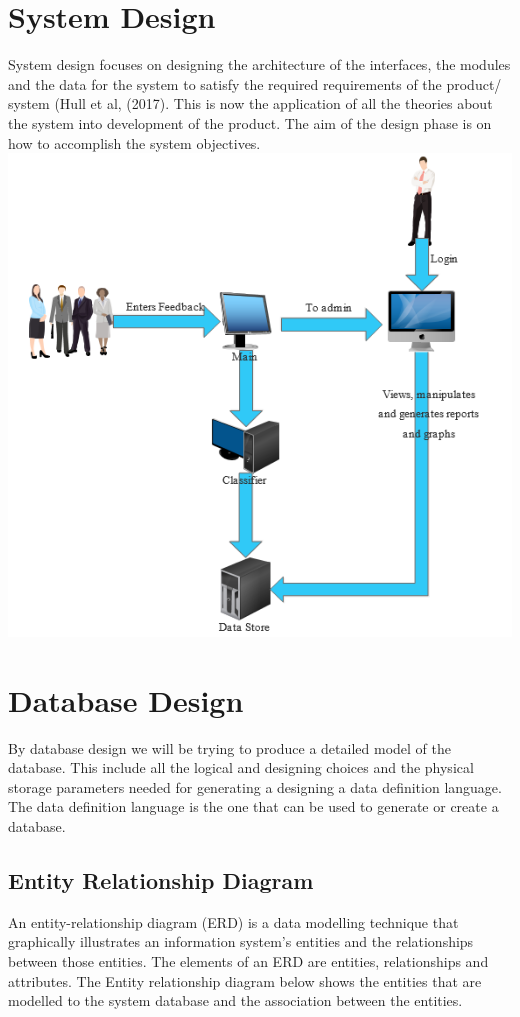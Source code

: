 \documentclass[12pt]{report}
\begin{document}
	\section{System Design}
	System design focuses on designing the architecture of the interfaces, the modules and the data for the system to satisfy the required requirements of the product/ system (Hull et al, (2017). This is now the application of all the theories about the system into development of the product. The aim of the design phase is on how to accomplish the system objectives.
	\\
	
	\includegraphics[scale=0.5]{aka.png}
	
	\section{Database Design}
	By database design we will be trying to produce a detailed model of the database. This include all the logical and designing choices and the physical storage parameters needed for generating a designing a data definition language. The data definition language is the one that can be used to generate or create a database.\\
	
	\subsection{Entity Relationship Diagram}
	An entity-relationship diagram (ERD) is a data modelling technique that graphically illustrates an information system's entities and the relationships between those entities. The elements of an ERD are entities, relationships and attributes. The Entity relationship diagram below shows the entities that are modelled to the system database and the association between the entities.\\
	
\end{document}
